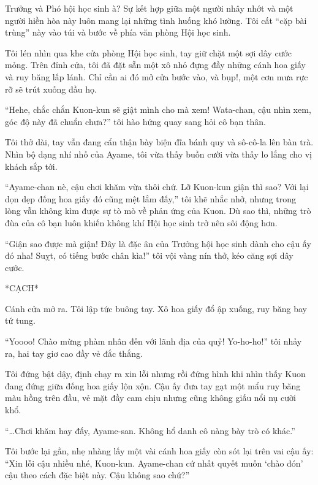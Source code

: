 \documentclass[../main.tex]{subfiles}
\begin{document}
Trưởng và Phó hội học sinh à? Sự kết hợp giữa một người nhây nhớt và một người hiền hòa này luôn mang lại những tình huống khó lường. Tôi cất ``cặp bài trùng'' này vào túi và bước về phía văn phòng Hội học sinh.

\ct


Tôi lén nhìn qua khe cửa phòng Hội học sinh, tay giữ chặt một sợi dây cước mỏng. Trên đỉnh cửa, tôi đã đặt sẵn một xô nhỏ đựng đầy những cánh hoa giấy và ruy băng lấp lánh. Chỉ cần ai đó mở cửa bước vào, và bụp!, một cơn mưa rực rỡ sẽ trút xuống đầu họ.

``Hehe, chắc chắn Kuon-kun sẽ giật mình cho mà xem! Wata-chan, cậu nhìn xem, góc độ này đã chuẩn chưa?'' tôi hào hứng quay sang hỏi cô bạn thân.


Tôi thở dài, tay vẫn đang cẩn thận bày biện đĩa bánh quy và sô-cô-la lên bàn trà. Nhìn bộ dạng nhí nhố của Ayame, tôi vừa thấy buồn cười vừa thấy lo lắng cho vị khách sắp tới.

``Ayame-chan nè, cậu chơi khăm vừa thôi chứ. Lỡ Kuon-kun giận thì sao? Với lại dọn dẹp đống hoa giấy đó cũng mệt lắm đấy,'' tôi khẽ nhắc nhở, nhưng trong lòng vẫn không kìm được sự tò mò về phản ứng của Kuon. Dù sao thì, những trò đùa của cô bạn luôn khiến không khí Hội học sinh trở nên sôi động hơn.


``Giận sao được mà giận! Đây là đặc ân của Trưởng hội học sinh dành cho cậu ấy đó nha! Suỵt, có tiếng bước chân kìa!'' tôi vội vàng nín thở, kéo căng sợi dây cước.

*CẠCH*

Cánh cửa mở ra. Tôi lập tức buông tay. Xô hoa giấy đổ ập xuống, ruy băng bay tứ tung.

``Yoooo! Chào mừng phàm nhân đến với lãnh địa của quỷ! Yo-ho-ho!'' tôi nhảy ra, hai tay giơ cao đầy vẻ đắc thắng.


Tôi đứng bật dậy, định chạy ra xin lỗi nhưng rồi đứng hình khi nhìn thấy Kuon đang đứng giữa đống hoa giấy lộn xộn. Cậu ấy đưa tay gạt một mẩu ruy băng màu hồng trên đầu, vẻ mặt đầy cam chịu nhưng cũng không giấu nổi nụ cười khổ.

``\dots Chơi khăm hay đấy, Ayame-san. Không hổ danh cô nàng bày trò có khác.''

Tôi bước lại gần, nhẹ nhàng lấy một vài cánh hoa giấy còn sót lại trên vai cậu ấy: ``Xin lỗi cậu nhiều nhé, Kuon-kun. Ayame-chan cứ nhất quyết muốn `chào đón' cậu theo cách đặc biệt này. Cậu không sao chứ?''
\end{document}
